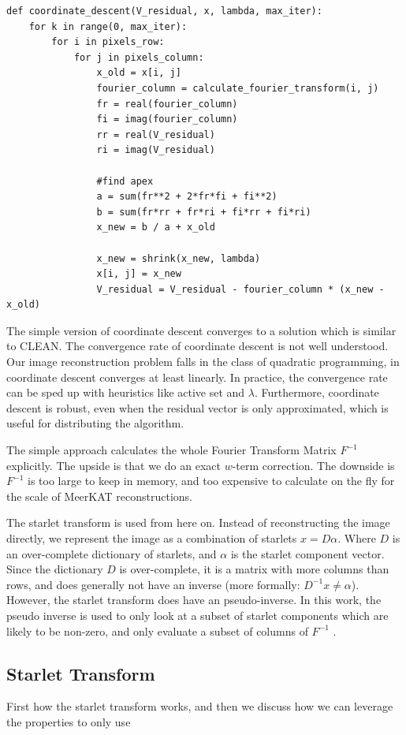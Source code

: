 \begin{lstlisting} 
def coordinate_descent(V_residual, x, lambda, max_iter):
	for k in range(0, max_iter):
		for i in pixels_row:
			for j in pixels_column:
				x_old = x[i, j]
				fourier_column = calculate_fourier_transform(i, j)
				fr = real(fourier_column)
				fi = imag(fourier_column)
				rr = real(V_residual)
				ri = imag(V_residual)
				
				#find apex
				a = sum(fr**2 + 2*fr*fi + fi**2)
				b = sum(fr*rr + fr*ri + fi*rr + fi*ri)
				x_new = b / a + x_old
				
				x_new = shrink(x_new, lambda)
				x[i, j] = x_new
				V_residual = V_residual - fourier_column * (x_new - x_old)
\end{lstlisting}\label{cd:basic}

The simple version of coordinate descent converges to a solution which is similar to CLEAN. The convergence rate of coordinate descent is not well understood. Our image reconstruction problem falls in the class of quadratic programming, in coordinate descent converges at least linearly\cite{luo1992convergence}. In practice, the convergence rate can be sped up with heuristics like active set\cite{activeset} and $\lambda$\cite{lambda}. Furthermore, coordinate descent is robust, even when the residual vector is only approximated, which is useful for distributing the algorithm.

The simple approach calculates the whole Fourier Transform Matrix $F^{-1}$ explicitly. The upside is that we do an exact $w$-term correction. The downside is $F^{-1}$ is too large to keep in memory, and too expensive to calculate on the fly for the scale of MeerKAT reconstructions. 

The starlet transform is used from here on. Instead of reconstructing the image directly, we represent the image as a combination of starlets $x = D\alpha$. Where $D$ is an over-complete dictionary of starlets, and $\alpha$ is the starlet component vector. Since the dictionary $D$ is over-complete, it is a matrix with more columns than rows, and does generally not have an inverse (more formally: $D^{-1}x \neq \alpha$). However, the starlet transform does have an pseudo-inverse. In this work, the pseudo inverse is used to only look at a subset of starlet components which are likely to be non-zero, and only evaluate a subset of columns of $F^{-1}$ .

\subsection{Starlet Transform} \label{cd:starlets}
First how the starlet transform works, and then we discuss how we can leverage the properties to only use


